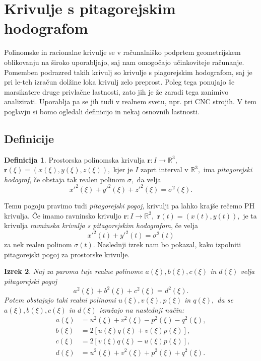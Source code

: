 \documentclass[12pt,a4paper,twoside]{article}
\theoremstyle{definition} %
\newtheorem{definicija}{Definicija}[section]
\theoremstyle{plain} %
\newtheorem{izrek}[definicija]{Izrek}
\numberwithin{equation}{section}  %
\newcommand{\R}{\mathbb R}
\newcommand{\rV}{\mathbf{r}}
\begin{document}
\section{Krivulje s pitagorejskim hodografom}

Polinomske in racionalne krivulje se v računalniško podprtem geometrijskem oblikovanju na široko uporabljajo, saj nam omogočajo učinkoviteje računanje. Pomemben podrazred takih krivulj so krivulje s piagorejskim hodografom, saj je pri le-teh izračun dolžine loka krivulj zelo preprost. Poleg tega ponujajo še marsikatere druge privlačne lastnosti, zato jih je že zaradi tega zanimivo analizirati. Uporablja pa se jih tudi v realnem svetu, npr. pri CNC strojih. V tem poglavju si bomo ogledali definicijo in nekaj osnovnih lastnosti.

\subsection{Definicije}

\begin{definicija}
	Prostorska polinomska krivulja $\rV:I \to \R^3,$ $\rV(\xi)=(x(\xi),y(\xi),z(\xi)),$ kjer je $I$ zaprt interval v $\R^3,$ ima \emph{pitagorejski hodograf}, če obstaja tak realen polinom $\sigma,$ da velja
	\begin{equation}
		\label{pitagorejski}
		x'^2(\xi)+y'^2(\xi)+z'^2(\xi)=\sigma^2(\xi).
	\end{equation}
\end{definicija}

Temu pogoju pravimo tudi \emph{pitagorejski pogoj,} krivulji pa lahko krajše rečemo PH krivulja. Če imamo ravninsko krivuljo $\rV:I \to \R^2,$ $\rV(t)=(x(t),y(t)),$ je ta krivulja \emph{ravninska krivulja s pitagorejskim hodografom}, če velja
\begin{equation}
	\label{ravninski_pitagorejski}
	x'^2(t)+y'^2(t)=\sigma^2(t)
\end{equation}
za nek realen polinom $\sigma(t).$ Naslednji izrek nam bo pokazal, kako izpolniti pitagorejski pogoj za prostorske krivulje.
\begin{izrek}
	Naj za paroma tuje realne polinome $a(\xi),b(\xi),c(\xi)$ in $d(\xi)$ velja pitagorejski pogoj
	\begin{equation}
		\label{pogoj_izrek4_2}
		a^2(\xi)+b^2(\xi)+c^2(\xi)=d^2(\xi).
	\end{equation}
	Potem obstajajo taki realni polinomi $u(\xi),v(\xi),p(\xi)$ in $q(\xi),$ da se $a(\xi),b(\xi),c(\xi)$ in $d(\xi)$ izražajo na naslednji način:
	\begin{align}
		a(\xi)&=u^2(\xi)+v^2(\xi)-p^2(\xi)-q^2(\xi), \nonumber \\
		b(\xi)&=2[u(\xi)q(\xi)+v(\xi)p(\xi)], \nonumber \\
		c(\xi)&=2[v(\xi)q(\xi)-u(\xi)p(\xi)], \nonumber \\
		d(\xi)&=u^2(\xi)+v^2(\xi)+p^2(\xi)+q^2(\xi). \label{izrek4_3}
	\end{align}
\end{izrek}
\end{document}
